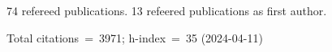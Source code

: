 74 refereed publications. 13 refeered publications as first author.

Total citations~=~3971; h-index~=~35 (2024-04-11)